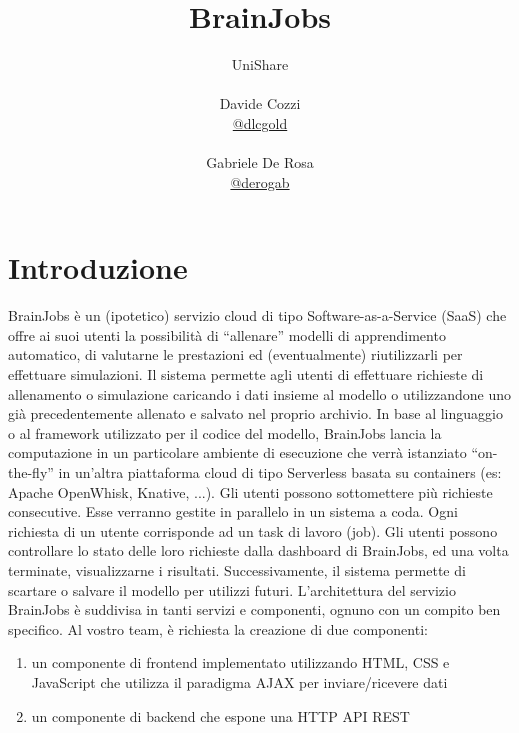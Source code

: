 \documentclass[a4paper,12pt, oneside]{book}
\title{BrainJobs}
\author{UniShare\\\\Davide Cozzi\\\href{https://t.me/dlcgold}{@dlcgold}\\\\Gabriele De Rosa\\\href{https://t.me/derogab}{@derogab}}}
\date{}
\begin{document}
\maketitle


\newtheorem{teorema}{Teorema}
\newtheorem{definizione}{Definizione}
\newtheorem{esempio}{Esempio}
\newtheorem{corollario}{Corollario}
\newtheorem{lemma}{Lemma}
\newtheorem{osservazione}{Osservazione}
\newtheorem{nota}{Nota}
\newtheorem{esercizio}{Esercizio}
\tableofcontents
\renewcommand{\chaptermark}[1]{%
	\markboth{\chaptername
		\ \thechapter.\ #1}{}}
\renewcommand{\sectionmark}[1]{\markright{\thesection.\ #1}}

\chapter{Introduzione}
BrainJobs è un (ipotetico) servizio cloud di tipo Software-as-a-Service (SaaS) che offre ai
suoi utenti la possibilità di “allenare” modelli di apprendimento automatico, di valutarne le
prestazioni ed (eventualmente) riutilizzarli per effettuare simulazioni.
Il sistema permette agli utenti di effettuare richieste di allenamento o simulazione caricando i
dati insieme al modello o utilizzandone uno già precedentemente allenato e salvato nel
proprio archivio. In base al linguaggio o al framework utilizzato per il codice del modello,
BrainJobs lancia la computazione in un particolare ambiente di esecuzione che verrà
istanziato “on-the-fly” in un’altra piattaforma cloud di tipo Serverless basata su containers
(es: Apache OpenWhisk, Knative, ...).
Gli utenti possono sottomettere più richieste consecutive. Esse verranno gestite in parallelo
in un sistema a coda. Ogni richiesta di un utente corrisponde ad un task di lavoro (job).
Gli utenti possono controllare lo stato delle loro richieste dalla dashboard di BrainJobs, ed
una volta terminate, visualizzarne i risultati. Successivamente, il sistema permette di scartare
o salvare il modello per utilizzi futuri.
L’architettura del servizio BrainJobs è suddivisa in tanti servizi e componenti, ognuno con un
compito ben specifico. Al vostro team, è richiesta la creazione di due componenti:
\begin{enumerate}
\item un componente di frontend implementato utilizzando HTML, CSS e JavaScript che
  utilizza il paradigma AJAX per inviare/ricevere dati
\item un componente di backend che espone una HTTP API REST
\end{enumerate}
\end{document}
